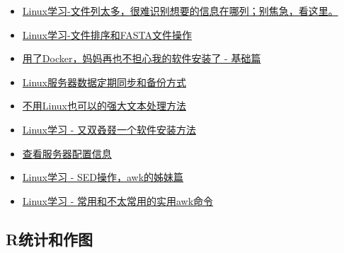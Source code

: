 \documentclass[]{article}
\numberwithin{figure}{section}
\numberwithin{table}{section}
\theoremstyle{definition}
\theoremstyle{definition}
\theoremstyle{definition}
\theoremstyle{remark}
\begin{document}
\begin{itemize}
\item
  \href{http://mp.weixin.qq.com/s?__biz=MzI5MTcwNjA4NQ==\&mid=2247483952\&idx=1\&sn=5312e0bab13182b118376018cb69674b\&chksm=ec0dc7badb7a4eacb5d96d971df6ccd940435b7525962963e625736efd2a413ae76844c3ee48\#rd}{Linux学习-文件列太多，很难识别想要的信息在哪列；别焦急，看这里。}
\item
  \href{http://mp.weixin.qq.com/s?__biz=MzI5MTcwNjA4NQ==\&mid=2247483823\&idx=1\&sn=ac62450f0475dc9513e75009f0670f45\&chksm=ec0dc425db7a4d3300f547caeaee709425dd0a41c86be18aab44d41619a4d18944289b0deaf8\#rd"\}}{Linux学习-文件排序和FASTA文件操作}
\item
  \href{http://mp.weixin.qq.com/s?__biz=MzI5MTcwNjA4NQ==\&mid=2247483840\&idx=1\&sn=f87f6dd703cd8c109f6dc5b8d12ffb7c\&chksm=ec0dc44adb7a4d5c9ff2422c730b1d7bb18dcb6947c0e7449f1678aee492c3193302174930b4\#rd}{用了Docker，妈妈再也不担心我的软件安装了
  - 基础篇}
\item
  \href{http://mp.weixin.qq.com/s?__biz=MzI5MTcwNjA4NQ==\&mid=2247483950\&idx=1\&sn=6f4dbc46a064638d7c95b9f99cb1de70\&chksm=ec0dc7a4db7a4eb20751dd6567b1c97be7d536671af07707eb57bb1ea7865cbde17a0226a6e0\#rd}{Linux服务器数据定期同步和备份方式}
\item
  \href{http://mp.weixin.qq.com/s?__biz=MzI5MTcwNjA4NQ==\&mid=2247484250\&idx=1\&sn=d4759dc05a55643549646c77318c4f96\&chksm=ec0dc6d0db7a4fc64791896914547b5ce818e8bd3cca98f0fb7bf6ebd9029fe6fd08a4d55255\#rd}{不用Linux也可以的强大文本处理方法}
\item
  \href{http://mp.weixin.qq.com/s/A4_j8ZbyprMr1TT_wgisQQ}{Linux学习 -
  又双叒叕一个软件安装方法}
\item
  \href{http://mp.weixin.qq.com/s/xq0JfkHJJeHQk1acjOAJUQ}{查看服务器配置信息}
\item
  \href{http://mp.weixin.qq.com/s/cywkIeRbhkYTZvkwTeIVSA}{Linux学习 -
  SED操作，awk的姊妹篇}
\item
  \href{http://mp.weixin.qq.com/s/8wD14FXt7fLDo1BjJyT0ew}{Linux学习 -
  常用和不太常用的实用awk命令}
\end{itemize}

\subsection{R统计和作图}\label{r}
\end{document}
